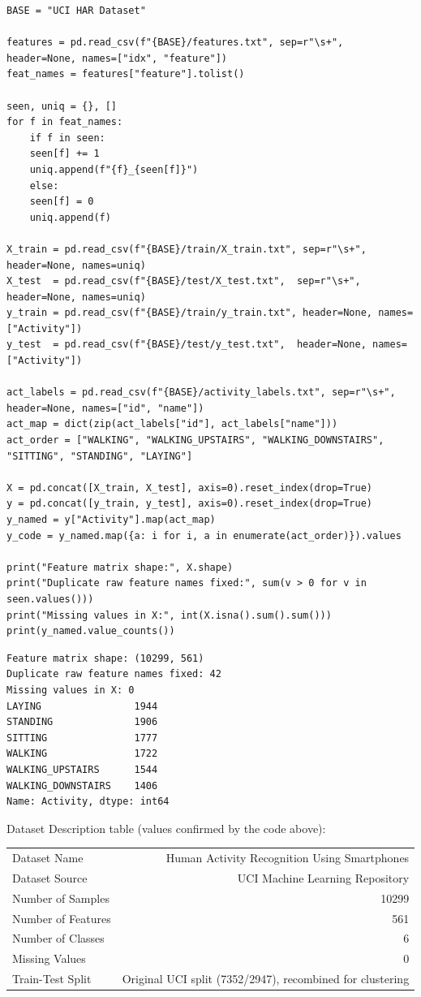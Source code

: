 \documentclass[12pt,a4paper]{article}
\begin{document}
\begin{verbatim}
BASE = "UCI HAR Dataset"

features = pd.read_csv(f"{BASE}/features.txt", sep=r"\s+", header=None, names=["idx", "feature"])
feat_names = features["feature"].tolist()

seen, uniq = {}, []
for f in feat_names:
    if f in seen:
	seen[f] += 1
	uniq.append(f"{f}_{seen[f]}")
    else:
	seen[f] = 0
	uniq.append(f)

X_train = pd.read_csv(f"{BASE}/train/X_train.txt", sep=r"\s+", header=None, names=uniq)
X_test  = pd.read_csv(f"{BASE}/test/X_test.txt",  sep=r"\s+", header=None, names=uniq)
y_train = pd.read_csv(f"{BASE}/train/y_train.txt", header=None, names=["Activity"])
y_test  = pd.read_csv(f"{BASE}/test/y_test.txt",  header=None, names=["Activity"])

act_labels = pd.read_csv(f"{BASE}/activity_labels.txt", sep=r"\s+", header=None, names=["id", "name"])
act_map = dict(zip(act_labels["id"], act_labels["name"]))
act_order = ["WALKING", "WALKING_UPSTAIRS", "WALKING_DOWNSTAIRS", "SITTING", "STANDING", "LAYING"]

X = pd.concat([X_train, X_test], axis=0).reset_index(drop=True)
y = pd.concat([y_train, y_test], axis=0).reset_index(drop=True)
y_named = y["Activity"].map(act_map)
y_code = y_named.map({a: i for i, a in enumerate(act_order)}).values

print("Feature matrix shape:", X.shape)
print("Duplicate raw feature names fixed:", sum(v > 0 for v in seen.values()))
print("Missing values in X:", int(X.isna().sum().sum()))
print(y_named.value_counts())
\end{verbatim}

\begin{verbatim}
Feature matrix shape: (10299, 561)
Duplicate raw feature names fixed: 42
Missing values in X: 0
LAYING                1944
STANDING              1906
SITTING               1777
WALKING               1722
WALKING_UPSTAIRS      1544
WALKING_DOWNSTAIRS    1406
Name: Activity, dtype: int64
\end{verbatim}

Dataset Description table (values confirmed by the code above):

\begin{center}
\begin{tabular}{lr}
\hline
Dataset Name & Human Activity Recognition Using Smartphones\\
Dataset Source & UCI Machine Learning Repository\\
Number of Samples & 10299\\
Number of Features & 561\\
Number of Classes & 6\\
Missing Values & 0\\
Train-Test Split & Original UCI split (7352/2947), recombined for clustering\\
\hline
\end{tabular}
\end{center}
\end{document}
